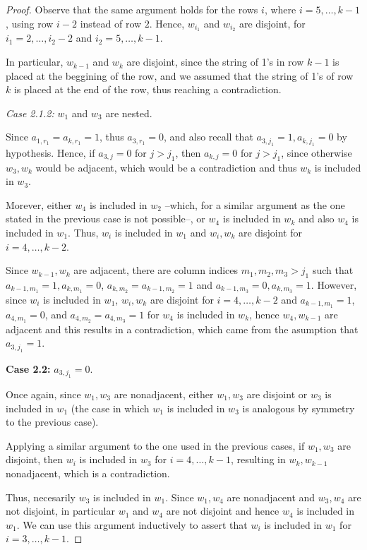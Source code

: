 \documentclass[a4paper,10pt]{report}
\theoremstyle{plain}
\theoremstyle{remark}
\theoremstyle{plain}
\begin{document}
\begin{proof}
	Observe that the same argument holds for the rows $i$, where $i = 5, \ldots, k-1$, using row $i-2$ instead of row $2$.
	Hence, $w_{i_1}$ and $w_{i_2}$ are disjoint, for $i_1=2, \ldots, i_2 - 2$ and $i_2 = 5, \ldots, k-1$. 
	
	In particular, $w_{k-1}$ and $w_k$ are disjoint, since the string of 1's in row $k-1$ is placed at the beggining of the row, 
	and we assumed that the string of 1's of row $k$ is placed at the end of the row, thus reaching a contradiction.
	
	\vspace{.3mm}
	\textit{Case 2.1.2:} $w_1$ and $w_3$ are nested.
	
	Since $a_{1, r_1} = a_{k,r_1} = 1$, thus $a_{3,r_1} = 0$, 
	and also recall that $a_{3,j_1} = 1, a_{k,j_1} = 0$ by hypothesis. 
	Hence, if $a_{3,j} = 0$ for $j > j_1$, then $a_{k,j} = 0$ for $j > j_1$, since otherwise $w_3,w_k$ would be adjacent, which would be a contradiction
	and thus $w_k$ is included in $w_3$.
	
	Morever, either $w_4$ is included in $w_2$ --which, for a similar argument as the one stated in the previous case is not possible--, 
	or $w_4$ is included in $w_k$ and also $w_4$ is included in $w_1$. Thus, $w_i$ is included in $w_1$ and $w_i,w_k$ are disjoint for $i = 4, \ldots, k-2$. 
	
	Since $w_{k-1}, w_k$ are adjacent, there are column indices $m_1, m_2, m_3 > j_1$ such that $a_{k-1,m_1} = 1, a_{k,m_1} = 0$,
	$a_{k,m_2} = a_{k-1,m_2} = 1$ and $a_{k-1,m_3} = 0, a_{k,m_3} = 1$.
	However, since $w_i$ is included in $w_1$, $w_i,w_k$ are disjoint for $i = 4, \ldots, k-2$ and $a_{k-1,m_1} = 1$, 
	$a_{4,m_1} = 0$, and $a_{4,m_2} = a_{4,m_3} = 1$ for $w_4$ is included in $w_k$, hence $w_4, w_{k-1}$ are adjacent 
	and this results in a contradiction, which came from the asumption that $a_{3,j_1} = 1$.
	
	\vspace{.5mm}
	\textbf{Case 2.2:} $a_{3,j_1} = 0$.
	
	Once again, since $w_1, w_3$ are nonadjacent, either $w_1, w_3$ are disjoint or $w_3$ is included in $w_1$ 
	(the case in which $w_1$ is included in $w_3$ is analogous by symmetry to the previous case).
	
	Applying a similar argument to the one used in the previous cases, if $w_1, w_3$ are disjoint, then $w_i$ is included in $w_3 $ for $i = 4, \ldots, k-1$,
	resulting in $w_k, w_{k-1}$ nonadjacent, which is a contradiction. 
	
	Thus, necesarily $w_3$ is included in $w_1$. Since $w_1, w_4$ are nonadjacent and $w_3,w_4$ are not disjoint, 
	in particular $w_1$ and $w_4$ are not disjoint and hence $w_4$ is included in $w_1$.
	We can use this argument inductively to assert that $w_i$ is included in $w_1$ for $i = 3, \ldots, k-1$.
	

\end{proof}
\end{document}

